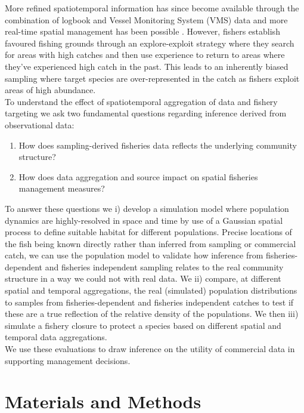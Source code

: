 \documentclass[review]{elsarticle}
\begin{document}
More refined spatiotemporal information has since become available through the
combination of logbook and Vessel Monitoring System (VMS) data \citep{Lee2010,
	Bastardie2010, Gerritsen2012, Mateo2016} and more real-time spatial
management has been possible \citep[e.g.][]{Holmes2011}.  However, fishers
establish favoured fishing grounds through an explore-exploit strategy
\citep{Bailey2018} where they search for areas with high catches and then use
experience to return to areas where they've experienced high catch in the past.
This leads to an inherently biased sampling where target species are
over-represented in the catch as fishers exploit areas of high abundance. \\ 

To understand the effect of spatiotemporal aggregation of data and fishery
targeting we ask two fundamental questions regarding inference derived from
observational data:

\begin{enumerate}
	\item How does sampling-derived fisheries data reflects the underlying
		community structure? 	
	\item How does data aggregation and source impact on spatial fisheries
	management measures?
\end{enumerate}
	
To answer these questions we i) develop a simulation model where population
dynamics are highly-resolved in space and time by use of a Gaussian spatial
process to define suitable habitat for different populations.  Precise
locations of the fish being known directly rather than inferred from sampling
or commercial catch, we can use the population model to validate how inference
from fisheries-dependent and fisheries independent sampling relates to the real
community structure in a way we could not with real data. We ii) compare, at
different spatial and temporal aggregations, the real (simulated) population
distributions to samples from fisheries-dependent and fisheries independent
catches to test if these are a true reflection of the relative density of the
populations. We then iii) simulate a fishery closure to protect a species based
on different spatial and temporal data aggregations. \\

We use these evaluations to draw inference on the utility of commercial data in
supporting management decisions.  

\section{Materials and Methods}
\end{document}
